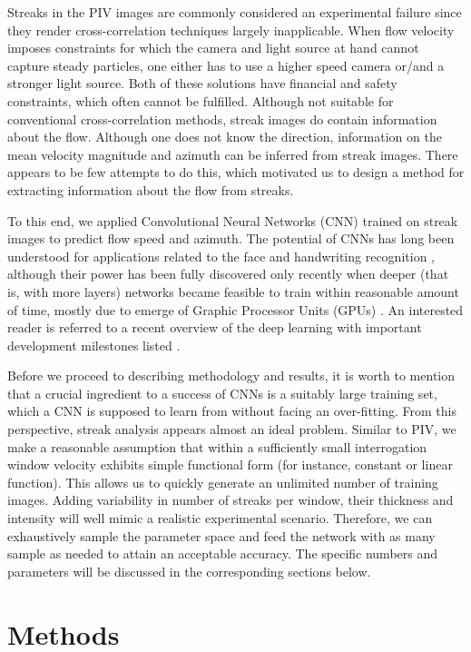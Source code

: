 \documentclass{svjour3}                     %
\begin{document}
Streaks in the PIV images are commonly considered an experimental failure since they render cross-correlation techniques largely inapplicable. When flow velocity imposes constraints for which the camera and light source at hand cannot capture steady particles, one either has to use a higher speed camera or/and a stronger light source. Both of these solutions have financial and safety constraints, which often cannot be fulfilled. Although not suitable for conventional cross-correlation methods, streak images do contain information about the flow. Although one does not know the direction, information on the mean velocity magnitude and azimuth can be inferred from streak images. There appears to be few attempts to do this, which motivated us to design a method for extracting information about the flow from streaks. 

To this end, we applied Convolutional Neural Networks (CNN) trained on streak images to predict flow speed and azimuth. The potential of CNNs has long been understood for applications related to the face and handwriting recognition \cite{lawrence1997face, simard2003best}, although their power has been fully discovered only recently when deeper (that is, with more layers) networks became feasible to train within reasonable amount of time, mostly due to emerge of Graphic Processor Units (GPUs) \cite{krizhevsky2012imagenet, karpathy2014large}. An interested reader is referred to a recent overview of the deep learning with important development milestones listed \cite{lecun2015deep}.

Before we proceed to describing methodology and results, it is worth to mention that a crucial ingredient to a success of CNNs is a suitably large training set, which a CNN is supposed to learn from without facing an over-fitting. From this perspective, streak analysis appears almost an ideal problem. Similar to PIV, we make a reasonable assumption that within a sufficiently small interrogation window velocity exhibits simple functional form (for instance, constant or linear function). This allows us to quickly generate an unlimited number of training images. Adding variability in number of streaks per window, their thickness and intensity will well mimic a realistic experimental scenario. Therefore, we can exhaustively sample the parameter space and feed the network with as many sample as needed to attain an acceptable accuracy. The specific numbers and parameters will be discussed in the corresponding sections below.

\section{Methods}
\label{sec:methodology}
\end{document}
